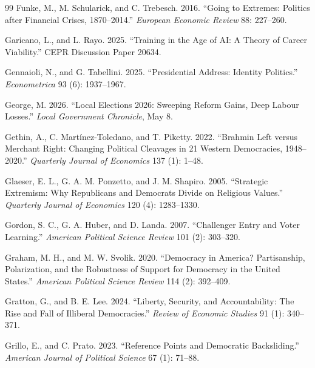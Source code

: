 \documentclass[12pt,letterpaper]{article}
\begin{document}
\begin{thebibliography}{99}
Funke, M., M. Schularick, and C. Trebesch. 2016. ``Going to Extremes: Politics after Financial Crises, 1870--2014.'' \textit{European Economic Review} 88: 227--260.

Garicano, L., and L. Rayo. 2025. ``Training in the Age of AI: A Theory of Career Viability.'' CEPR Discussion Paper 20634.

Gennaioli, N., and G. Tabellini. 2025. ``Presidential Address: Identity Politics.'' \textit{Econometrica} 93 (6): 1937--1967.

George, M. 2026. ``Local Elections 2026: Sweeping Reform Gains, Deep Labour Losses.'' \textit{Local Government Chronicle}, May 8.

Gethin, A., C. Mart\'{i}nez-Toledano, and T. Piketty. 2022. ``Brahmin Left versus Merchant Right: Changing Political Cleavages in 21 Western Democracies, 1948--2020.'' \textit{Quarterly Journal of Economics} 137 (1): 1--48.

Glaeser, E. L., G. A. M. Ponzetto, and J. M. Shapiro. 2005. ``Strategic Extremism: Why Republicans and Democrats Divide on Religious Values.'' \textit{Quarterly Journal of Economics} 120 (4): 1283--1330.

Gordon, S. C., G. A. Huber, and D. Landa. 2007. ``Challenger Entry and Voter Learning.'' \textit{American Political Science Review} 101 (2): 303--320.

Graham, M. H., and M. W. Svolik. 2020. ``Democracy in America? Partisanship, Polarization, and the Robustness of Support for Democracy in the United States.'' \textit{American Political Science Review} 114 (2): 392--409.

Gratton, G., and B. E. Lee. 2024. ``Liberty, Security, and Accountability: The Rise and Fall of Illiberal Democracies.'' \textit{Review of Economic Studies} 91 (1): 340--371.

Grillo, E., and C. Prato. 2023. ``Reference Points and Democratic Backsliding.'' \textit{American Journal of Political Science} 67 (1): 71--88.


\end{thebibliography}
\end{document}
